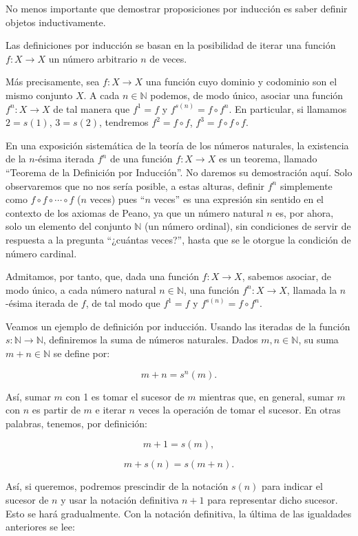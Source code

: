 No menos importante que demostrar proposiciones por inducción es saber definir objetos inductivamente.

Las definiciones por inducción se basan en la posibilidad de iterar una función \(f: X \to X\) un número arbitrario \(n\) de veces.

Más precisamente, sea \(f: X \to X\) una función cuyo dominio y codominio son el mismo conjunto \(X\). A cada \(n \in \mathbb{N}\) podemos, de modo único, asociar una función \(f^n: X \to X\) de tal manera que \(f^1 = f\) y \(f^{s(n)} = f \circ f^n\). En particular, si llamamos \(2 = s(1)\), \(3 = s(2)\), tendremos \(f^2 = f \circ f\), \(f^3 = f \circ f \circ f\).

En una exposición sistemática de la teoría de los números naturales, la existencia de la \(n\)-ésima iterada \(f^n\) de una función \(f: X \to X\) es un teorema, llamado “Teorema de la Definición por Inducción”. No daremos su demostración aquí. Solo observaremos que no nos sería posible, a estas alturas, definir \(f^n\) simplemente como \(f \circ f \circ \cdots \circ f\) (\(n\) veces) pues “\(n\) veces” es una expresión sin sentido en el contexto de los axiomas de Peano, ya que un número natural \(n\) es, por ahora, solo un elemento del conjunto \(\mathbb{N}\) (un número ordinal), sin condiciones de servir de respuesta a la pregunta “¿cuántas veces?”, hasta que se le otorgue la condición de número cardinal.

Admitamos, por tanto, que, dada una función \(f: X \to X\), sabemos asociar, de modo único, a cada número natural \(n \in \mathbb{N}\), una función \(f^n: X \to X\), llamada la \(n\)-ésima iterada de \(f\), de tal modo que \(f^1 = f\) y \(f^{s(n)} = f \circ f^n\).

Veamos un ejemplo de definición por inducción. Usando las iteradas de la función \(s: \mathbb{N} \to \mathbb{N}\), definiremos la suma de números naturales. Dados \(m, n \in \mathbb{N}\), su suma \(m + n \in \mathbb{N}\) se define por:

\[m + n = s^n(m).\]

Así, sumar \(m\) con 1 es tomar el sucesor de \(m\) mientras que, en general, sumar \(m\) con \(n\) es partir de \(m\) e iterar \(n\) veces la operación de tomar el sucesor. En otras palabras, tenemos, por definición:

\[m + 1 = s(m),\]

\[m + s(n) = s(m + n).\]

Así, si queremos, podremos prescindir de la notación \(s(n)\) para indicar el sucesor de \(n\) y usar la notación definitiva \(n + 1\) para representar dicho sucesor. Esto se hará gradualmente. Con la notación definitiva, la última de las igualdades anteriores se lee:

